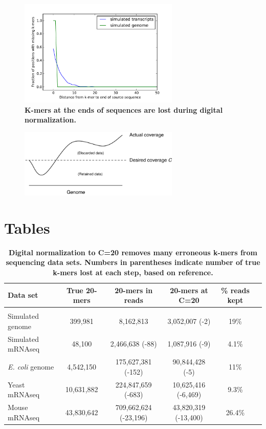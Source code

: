 \documentclass{pnastwo}
\begin{document}
\begin{figure}
\centerline{\includegraphics[width=3in]{diginorm-endbias.pdf}}
\caption{
{\bf K-mers at the ends of sequences are lost during digital normalization.}}
\label{fig:endloss}
\end{figure}

\begin{figure}
\centerline{\includegraphics[width=3in]{schematic.pdf}}
\caption{}
\label{fig:schematic}
\end{figure}

\section*{Tables}

\begin{table}[!ht]
\caption{
\bf{Digital normalization to C=20 removes many erroneous k-mers from sequencing data sets.  Numbers
in parentheses indicate number of true k-mers lost at each step, based on reference.}}
\begin{tabular}{|l|c|c|c|c|c|}
Data set & True 20-mers & 20-mers in reads & 20-mers at C=20 & \% reads kept\\
\hline \\
Simulated genome & 399,981 & 8,162,813 & 3,052,007 (-2) & 19\% \\
Simulated mRNAseq & 48,100 & 2,466,638 (-88) & 1,087,916 (-9) & 4.1\% \\
{\em E. coli} genome & 4,542,150 & 175,627,381 (-152) & 90,844,428 (-5) & 11\% \\
Yeast mRNAseq & 10,631,882 & 224,847,659 (-683) & 10,625,416 (-6,469) & 9.3\% \\
Mouse mRNAseq & 43,830,642 & 709,662,624 (-23,196) & 43,820,319 (-13,400) & 26.4\% \\
\end{tabular}
\begin{flushleft}
\end{flushleft}
\label{tab:normC20}
\end{table}
\end{document}

